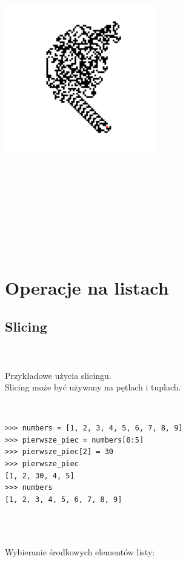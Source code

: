 \documentclass[a4paper, 12pt]{article}
\begin{document}
\includegraphics[width=0.5\textwidth]{LangtonsAnt.png}

\\ \\ \\ \\ \\ \\ \\





\section{Operacje na listach}

\subsection{Slicing}

\\ \\
Przykładowe użycia slicingu. \\
Slicing może być używany na pętlach i tuplach.

\\
\noindent\begin{minipage}{\linewidth}
\begin{lstlisting}[style=python]
>>> numbers = [1, 2, 3, 4, 5, 6, 7, 8, 9]
>>> pierwsze_piec = numbers[0:5]
>>> pierwsze_piec[2] = 30
>>> pierwsze_piec
[1, 2, 30, 4, 5]
>>> numbers
[1, 2, 3, 4, 5, 6, 7, 8, 9]
\end{lstlisting}
\end{minipage}
\\ \\ 
\pagebreak

Wybieranie środkowych elementów listy:
\\
\end{document}
